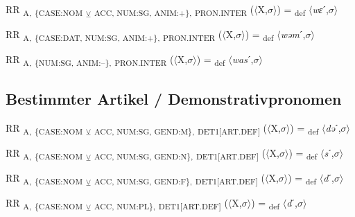 {\begin{exe}
 RR \textsubscript{A,} \textsubscript{\{CASE:NOM} \textsubscript{${\veebar}$}\textsubscript{ ACC, NUM:SG, ANIM:+\},} \textsubscript{PRON.INTER} ($\langle$X,$\sigma $$\rangle$) = \textsubscript{def} $\langle$\textit{wɛ}ˊ,$\sigma $$\rangle$
\end{exe}

\begin{exe}
 RR \textsubscript{A,} \textsubscript{\{CASE:DAT, NUM:SG, ANIM:+\},} \textsubscript{PRON.INTER} ($\langle$X,$\sigma $$\rangle$) = \textsubscript{def} $\langle$\textit{wəm}ˊ,$\sigma $$\rangle$
\end{exe}

\begin{exe}
 RR \textsubscript{A,} \textsubscript{\{NUM:SG, ANIM:–\},} \textsubscript{PRON.INTER} ($\langle$X,$\sigma $$\rangle$) = \textsubscript{def} $\langle$\textit{was}ˊ,$\sigma $$\rangle$
\end{exe}

\subsection{Bestimmter Artikel / Demonstrativpronomen}

\begin{exe}
 RR \textsubscript{A,} \textsubscript{\{CASE:NOM} \textsubscript{${\veebar}$}\textsubscript{ ACC, NUM:SG, GEND:M\},} \textsubscript{DET1[ART.DEF]} ($\langle$X,$\sigma $$\rangle$) = \textsubscript{def} $\langle$\textit{də}ˊ,$\sigma $$\rangle$
\end{exe}

\begin{exe}
 RR \textsubscript{A,} \textsubscript{\{CASE:NOM} \textsubscript{${\veebar}$}\textsubscript{ ACC, NUM:SG, GEND:N\},} \textsubscript{DET1[ART.DEF]} ($\langle$X,$\sigma $$\rangle$) = \textsubscript{def} $\langle$\textit{s}ˊ,$\sigma $$\rangle$
\end{exe}

\begin{exe}
 RR \textsubscript{A,} \textsubscript{\{CASE:NOM} \textsubscript{${\veebar}$}\textsubscript{ ACC, NUM:SG, GEND:F\},} \textsubscript{DET1[ART.DEF]} ($\langle$X,$\sigma $$\rangle$) = \textsubscript{def} $\langle$\textit{d}ˊ,$\sigma $$\rangle$
\end{exe}

\begin{exe}
 RR \textsubscript{A,} \textsubscript{\{CASE:NOM} \textsubscript{${\veebar}$}\textsubscript{ ACC, NUM:PL\},} \textsubscript{DET1[ART.DEF]} ($\langle$X,$\sigma $$\rangle$) = \textsubscript{def} $\langle$\textit{d}ˊ,$\sigma $$\rangle$
\end{exe}

}

